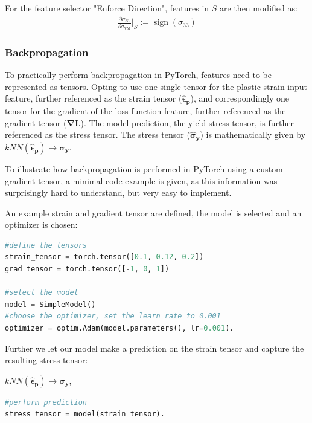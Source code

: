 For the feature selector "Enforce Direction", features in $S$ are then modified as:
\begin{align*}
\frac{\partial \sigma_{33}}{\partial \sigma_{\text{vM}}}\Big|_S := \operatorname{sign}(\sigma_{33})
\end{align*}

\subsubsection{Backpropagation}

To practically perform backpropagation in PyTorch, features need to be represented as tensors. Opting to use one single tensor for the plastic strain input feature, further referenced as the strain tensor (\(\boldsymbol{\hat{\epsilon}_p}\)), and correspondingly one tensor for the gradient of the loss function feature, further referenced as the gradient tensor (\(\boldsymbol{\nabla L}\)). The model prediction, the yield stress tensor, is further referenced as the stress tensor. The stress tensor (\(\boldsymbol{\hat{\sigma}_y}\)) is mathematically given by \(kNN(\boldsymbol{\hat{\epsilon}_p}) \rightarrow \boldsymbol{\hat{\sigma}_y}\).


To illustrate how backpropagation is performed in PyTorch using a custom gradient tensor, a minimal code example is given, as this information was surprisingly hard to understand, but very easy to implement.\citep{pytorch_custom_gradient}

An example strain and gradient tensor are defined, the model is selected and an optimizer is chosen:
\begin{lstlisting}[language=Python]
#define the tensors
strain_tensor = torch.tensor([0.1, 0.12, 0.2])
grad_tensor = torch.tensor([-1, 0, 1])

#select the model
model = SimpleModel()
#choose the optimizer, set the learn rate to 0.001
optimizer = optim.Adam(model.parameters(), lr=0.001).
\end{lstlisting}

Further we let our model make a prediction on the strain tensor and capture the resulting stress tensor:

\mbox{$kNN(\boldsymbol{\hat{\epsilon}_p}) \rightarrow \boldsymbol{\hat{\sigma}_y}$},

\begin{lstlisting}[language=Python]
#perform prediction
stress_tensor = model(strain_tensor).    
\end{lstlisting}

